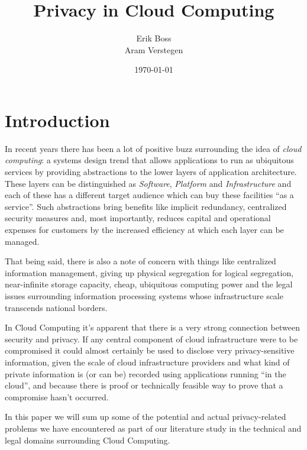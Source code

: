 \documentclass[11pt]{article}
\begin{document}
\title{Privacy in Cloud Computing}

\author{Erik Boss \\ Aram Verstegen}
\date{\today}
\maketitle


\section{Introduction}
In recent years there has been a lot of positive buzz surrounding the idea of \textit{cloud computing}: a systems design trend that allows applications to run as ubiquitous services by providing abstractions to the lower layers of application architecture.
These layers can be distinguished as \textit{Software}, \textit{Platform} and \textit{Infrastructure} and each of these has a different target audience which can buy these facilities ``as a service''.
Such abstractions bring benefits like implicit redundancy, centralized security measures and, most importantly, reduces capital and operational expenses for customers by the increased efficiency at which each layer can be managed.

That being said, there is also a note of concern with things like centralized information management, giving up physical segregation for logical segregation, near-infinite storage capacity, cheap, ubiquitous computing power and the legal issues surrounding information processing systems whose infrastructure scale transcends national borders.

In Cloud Computing it's apparent that there is a very strong connection between security and privacy.
If any central component of cloud infrastructure were to be compromised it could almost certainly be used to disclose very privacy-sensitive information, given the scale of cloud infrastructure providers and what kind of private information is (or can be) recorded using applications running ``in the cloud'', and because there is proof or technically feasible way to prove that a compromise hasn't occurred.

In this paper we will sum up some of the potential and actual privacy-related problems we have encountered as part of our literature study in the technical and legal domains surrounding Cloud Computing.
\end{document}
